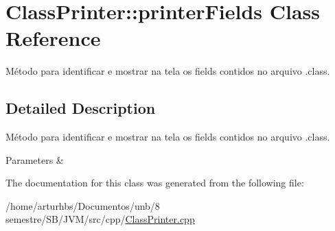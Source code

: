\hypertarget{classClassPrinter_1_1printerFields}{}\section{Class\+Printer\+:\+:printer\+Fields Class Reference}
\label{classClassPrinter_1_1printerFields}


Método para identificar e mostrar na tela os fields contidos no arquivo .class.  




\subsection{Detailed Description}
Método para identificar e mostrar na tela os fields contidos no arquivo .class. 


\begin{DoxyParams}{Parameters}
{\em } & \\
\hline
\end{DoxyParams}


The documentation for this class was generated from the following file\+:\begin{DoxyCompactItemize}
\item 
/home/arturhbs/\+Documentos/unb/8 semestre/\+S\+B/\+J\+V\+M/src/cpp/\hyperlink{ClassPrinter_8cpp}{Class\+Printer.\+cpp}\end{DoxyCompactItemize}

